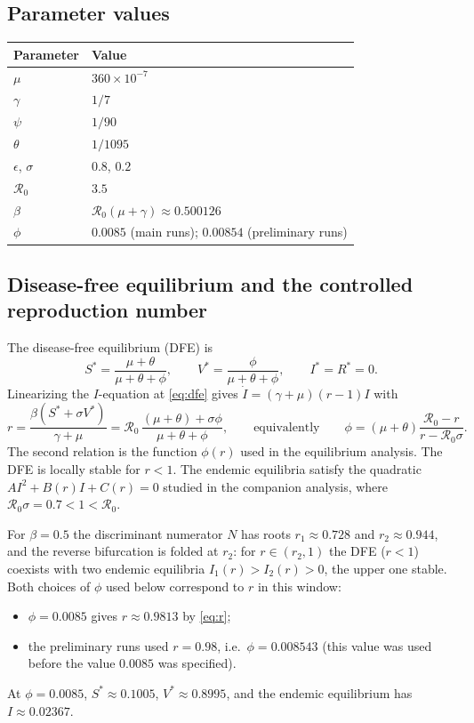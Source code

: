 \documentclass[11pt]{article}
\newcommand{\R}{\mathcal R_0}
\begin{document}
\subsection{Parameter values}

\begin{center}
\begin{tabular}{ll}
\toprule
Parameter & Value\\
\midrule
$\mu$ & $360\times10^{-7}$\\
$\gamma$ & $1/7$\\
$\psi$ & $1/90$\\
$\theta$ & $1/1095$\\
$\epsilon$, $\sigma$ & $0.8$, $0.2$\\
$\R$ & $3.5$\\
$\beta$ & $\R(\mu+\gamma)\approx0.500126$\\
$\phi$ & $0.0085$ (main runs); $0.00854$ (preliminary runs)\\
\bottomrule
\end{tabular}
\end{center}

\subsection{Disease-free equilibrium and the controlled reproduction number}

The disease-free equilibrium (DFE) is
\begin{equation}
S^*=\frac{\mu+\theta}{\mu+\theta+\phi},\qquad V^*=\frac{\phi}{\mu+\theta+\phi},\qquad I^*=R^*=0 .
\label{eq:dfe}
\end{equation}
Linearizing the $I$-equation at \eqref{eq:dfe} gives $\dot I=(\gamma+\mu)(r-1)I$ with
\begin{equation}
r=\frac{\beta(S^*+\sigma V^*)}{\gamma+\mu}=\R\,\frac{(\mu+\theta)+\sigma\phi}{\mu+\theta+\phi},
\qquad\text{equivalently}\qquad
\phi=(\mu+\theta)\frac{\R-r}{r-\R\sigma}.
\label{eq:r}
\end{equation}
The second relation is the function $\phi(r)$ used in the equilibrium analysis. The DFE is locally stable for $r<1$. The endemic equilibria satisfy the quadratic $AI^2+B(r)I+C(r)=0$ studied in the companion analysis, where $\R\sigma=0.7<1<\R$.

For $\beta=0.5$ the discriminant numerator $N$ has roots $r_1\approx0.728$ and $r_2\approx0.944$, and the reverse bifurcation is folded at $r_2$: for $r\in(r_2,1)$ the DFE ($r<1$) coexists with two endemic equilibria $I_1(r)>I_2(r)>0$, the upper one stable. Both choices of $\phi$ used below correspond to $r$ in this window:
\begin{itemize}
\item $\phi=0.0085$ gives $r\approx0.9813$ by \eqref{eq:r};
\item the preliminary runs used $r=0.98$, i.e.\ $\phi=0.008543$ (this value was used before the value $0.0085$ was specified).
\end{itemize}
At $\phi=0.0085$, $S^*\approx0.1005$, $V^*\approx0.8995$, and the endemic equilibrium has $I\approx0.02367$.
\end{document}
